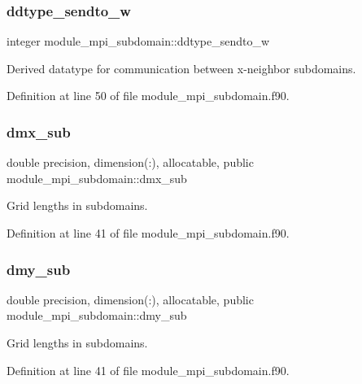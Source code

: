 \subsubsection{\texorpdfstring{ddtype\_sendto\_w}{ddtype\_sendto\_w}}
{\footnotesize\ttfamily integer module\+\_\+mpi\+\_\+subdomain\+::ddtype\+\_\+sendto\+\_\+w}



Derived datatype for communication between x-\/neighbor subdomains. 



Definition at line 50 of file module\+\_\+mpi\+\_\+subdomain.\+f90.

\mbox{\label{namespacemodule__mpi__subdomain_a0bd571c841b92676b5017401591b74b4}} 
\subsubsection{\texorpdfstring{dmx\_sub}{dmx\_sub}}
{\footnotesize\ttfamily double precision, dimension(\+:), allocatable, public module\+\_\+mpi\+\_\+subdomain\+::dmx\+\_\+sub}



Grid lengths in subdomains. 



Definition at line 41 of file module\+\_\+mpi\+\_\+subdomain.\+f90.

\mbox{\label{namespacemodule__mpi__subdomain_a8b9835b45cf90a956b5b921507040c2d}} 
\subsubsection{\texorpdfstring{dmy\_sub}{dmy\_sub}}
{\footnotesize\ttfamily double precision, dimension(\+:), allocatable, public module\+\_\+mpi\+\_\+subdomain\+::dmy\+\_\+sub}



Grid lengths in subdomains. 



Definition at line 41 of file module\+\_\+mpi\+\_\+subdomain.\+f90.

\mbox{\label{namespacemodule__mpi__subdomain_a9ffca06a0bb7f1ecf84d60e7679002fd}} 
